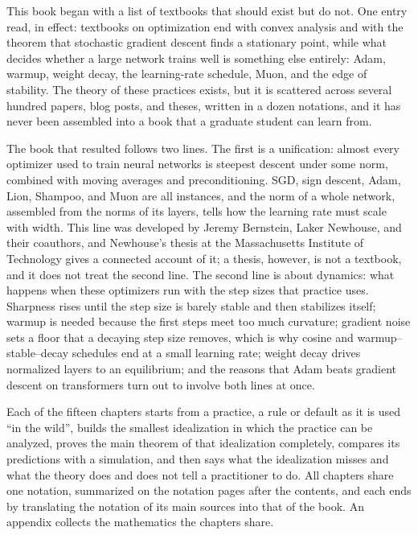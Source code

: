 
This book began with a list of textbooks that should exist but do not. One entry read, in effect: textbooks on optimization end with convex analysis and with the theorem that stochastic gradient descent finds a stationary point, while what decides whether a large network trains well is something else entirely: Adam, warmup, weight decay, the learning-rate schedule, Muon, and the edge of stability. The theory of these practices exists, but it is scattered across several hundred papers, blog posts, and theses, written in a dozen notations, and it has never been assembled into a book that a graduate student can learn from.

The book that resulted follows two lines. The first is a unification: almost every optimizer used to train neural networks is steepest descent under some norm, combined with moving averages and preconditioning. SGD, sign descent, Adam, Lion, Shampoo, and Muon are all instances, and the norm of a whole network, assembled from the norms of its layers, tells how the learning rate must scale with width. This line was developed by Jeremy Bernstein, Laker Newhouse, and their coauthors, and Newhouse's thesis at the Massachusetts Institute of Technology gives a connected account of it; a thesis, however, is not a textbook, and it does not treat the second line. The second line is about dynamics: what happens when these optimizers run with the step sizes that practice uses. Sharpness rises until the step size is barely stable and then stabilizes itself; warmup is needed because the first steps meet too much curvature; gradient noise sets a floor that a decaying step size removes, which is why cosine and warmup--stable--decay schedules end at a small learning rate; weight decay drives normalized layers to an equilibrium; and the reasons that Adam beats gradient descent on transformers turn out to involve both lines at once.

Each of the fifteen chapters starts from a practice, a rule or default as it is used ``in the wild'', builds the smallest idealization in which the practice can be analyzed, proves the main theorem of that idealization completely, compares its predictions with a simulation, and then says what the idealization misses and what the theory does and does not tell a practitioner to do. All chapters share one notation, summarized on the notation pages after the contents, and each ends by translating the notation of its main sources into that of the book. An appendix collects the mathematics the chapters share.


